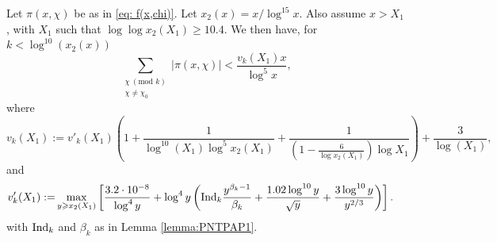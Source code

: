 \documentclass[12pt]{amsart}
\begin{document}
\begin{lemma}
\label{cor:chisum}
Let $\pi(x,\chi)$ be as in \eqref{eq: f(x,chi)}.
Let $x_2(x)=x/\log^{15} x$. Also assume $x> X_1$, with $X_1$ such that $\log\log x_2(X_1)\ge 10.4$. We then have, for $k<\log^{10}(x_2(x))$ 
\begin{equation}\label{pichieq}
    \sum_{\substack{\chi\: (\text{mod }k) \\ \chi \ne \chi_0}} \left|\pi(x,\chi)\right|< \frac{v_k(X_1)x}{\log^5 x},
\end{equation}
where
\begin{equation}\label{veq}
v_k(X_1):=v'_k(X_1)\left(1+\frac{1}{\log^{10}(X_1)\log^5 x_2(X_1)}+\frac{1}{\left(1-\frac{6}{\log x_2(X_1)}\right)\log X_1}\right)+\frac{3}{\log(X_1)},
\end{equation}
and 
\begin{align}
\label{eq:v1}
\begin{split}
v'_k(X_1):=&\max_{y\ge x_2(X_1)}\left[\frac{3.2\cdot 10^{-8}}{\log^{4} y}+  \log^{4} y\left(\textnormal{Ind}_k\frac{y^{\beta_k-1}}{\beta_k}+\frac{1.02\log^{10}y}{\sqrt{y}}+\frac{3\log^{10}y}{y^{2/3}}\right)\right].
\end{split}
\end{align}
with $\textnormal{Ind}_k$ and $\beta_k$ as in Lemma \ref{lemma:PNTPAP1}.
\end{lemma}
\end{document}
